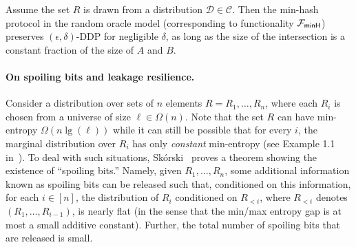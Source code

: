  
 \begin{theorem}[Informal]
     Assume the set $R$ is drawn from a distribution $\mathcal{D} \in \mathcal{C}$.
     Then the min-hash protocol in the random oracle model (corresponding to functionality ${\mathcal{F}_\mathsf{minH}}$)
     preserves $(\epsilon,\delta)$-DDP for negligible $\delta$,
     as long as the size of the intersection is a constant fraction of the size of $A$ and $B$.
 \end{theorem}

\paragraph{On spoiling bits and leakage resilience.}
Consider a distribution over sets of $n$ elements
$R = R_1, \ldots, R_n$, where each $R_i$ is chosen
from a universe of size $\ell \in \Omega(n)$.
Note that the set $R$ can have min-entropy
$\Omega(n \lg(\ell))$ while it can still be possible
that for every $i$, the marginal distribution
over $R_i$ has only {\em constant} min-entropy (see Example 1.1 in~\cite{DKZ18}).
To deal with such situations, Sk\'{o}rski~\cite{skorski2019strong} proves a theorem showing the existence of ``spoiling bits.'' Namely, given $R_1, \ldots, R_n$, some additional information
known as spoiling bits can be released such that, conditioned on this information, for each $i \in [n]$, the distribution of $R_i$ conditioned on $R_{<i}$, where $R_{<i}$ denotes $(R_1, \ldots, R_{i-1})$, is nearly flat
(in the sense that the min/max entropy gap is at most a small additive constant). Further, the total number of spoiling bits that are released is small.

